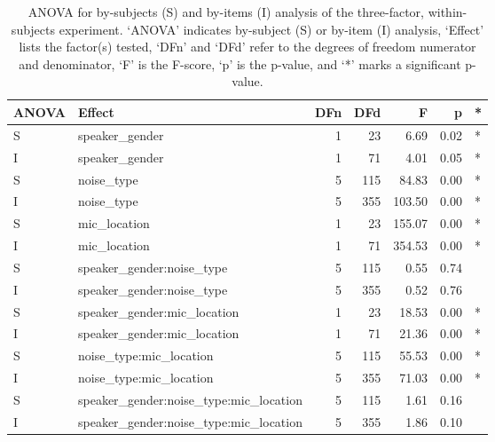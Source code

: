 \begin{table}[ht]
\centering
\begin{tabular}{llrrrrl}
  \hline
ANOVA & Effect & DFn & DFd & F & p & * \\ 
  \hline
S & speaker\_gender & 1 & 23 & 6.69 & 0.02 & * \\ 
  I & speaker\_gender & 1 & 71 & 4.01 & 0.05 & * \\ 
  S & noise\_type & 5 & 115 & 84.83 & 0.00 & * \\ 
  I & noise\_type & 5 & 355 & 103.50 & 0.00 & * \\ 
  S & mic\_location & 1 & 23 & 155.07 & 0.00 & * \\ 
  I & mic\_location & 1 & 71 & 354.53 & 0.00 & * \\ 
  S & speaker\_gender:noise\_type & 5 & 115 & 0.55 & 0.74 &  \\ 
  I & speaker\_gender:noise\_type & 5 & 355 & 0.52 & 0.76 &  \\ 
  S & speaker\_gender:mic\_location & 1 & 23 & 18.53 & 0.00 & * \\ 
  I & speaker\_gender:mic\_location & 1 & 71 & 21.36 & 0.00 & * \\ 
  S & noise\_type:mic\_location & 5 & 115 & 55.53 & 0.00 & * \\ 
  I & noise\_type:mic\_location & 5 & 355 & 71.03 & 0.00 & * \\ 
  S & speaker\_gender:noise\_type:mic\_location & 5 & 115 & 1.61 & 0.16 &  \\ 
  I & speaker\_gender:noise\_type:mic\_location & 5 & 355 & 1.86 & 0.10 &  \\ 
   \hline
\end{tabular}
\caption{ANOVA for by-subjects (S) and by-items (I) analysis of the three-factor, within-subjects experiment. \DIFaddbeginFL {}\DIFaddendFL `ANOVA' indicates by-subject (S) or by-item (I) analysis, `Effect' lists the factor(s) tested, `DFn' and `DFd' refer to the degrees of freedom numerator and denominator, `F' is the F-score, `p' is the p-value, and `*' marks a significant p-value.} 
\label{tab:anova1}
\end{table}



